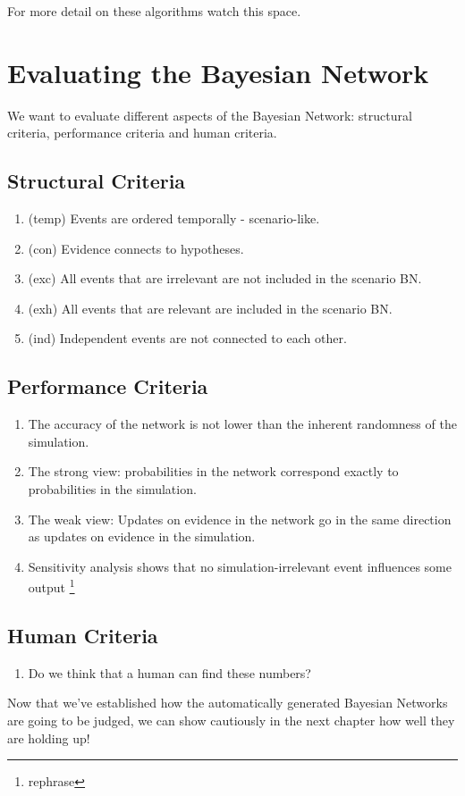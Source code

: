 For more detail on these algorithms watch this space.




\section{Evaluating the Bayesian Network}

We want to evaluate different aspects of the Bayesian Network: structural criteria, performance criteria and human criteria.

\subsection{Structural Criteria}
\begin{enumerate}
\item (temp) Events are ordered temporally - scenario-like.
\item (con) Evidence connects to hypotheses.
\item (exc) All events that are irrelevant are not included in the scenario BN.
\item (exh) All events that are relevant are included in the scenario BN.
\item (ind) Independent events are not connected to each other.
\end{enumerate}

\subsection{Performance Criteria}
\begin{enumerate}
\item The accuracy of the network is not lower than the inherent randomness of the simulation.
\item The strong view: probabilities in the network correspond exactly to probabilities in the simulation.
\item The weak view: Updates on evidence in the network go in the same direction as updates on evidence in the simulation.
\item Sensitivity analysis shows that no simulation-irrelevant event influences some output \footnote{rephrase}
\end{enumerate}

\subsection{Human Criteria}
\begin{enumerate}
\item Do we think that a human can find these numbers?
\end{enumerate}

Now that we've established how the automatically generated Bayesian Networks are going to be judged, we can show cautiously in the next chapter how well they are holding up!


